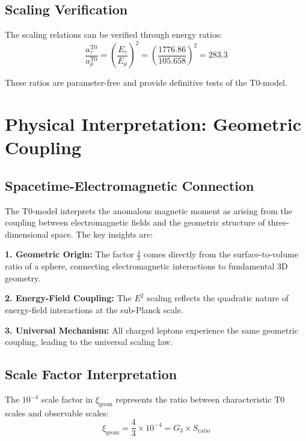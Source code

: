 \documentclass[12pt,a4paper]{report}
\newcommand{\xigeom}{\xi_{\text{geom}}}   %
\newcommand{\Emu}{E_\mu}                  %
\newcommand{\Etau}{E_\tau}                %
\begin{document}
\subsection{Scaling Verification}
\label{subsec:scaling_verification}

The scaling relations can be verified through energy ratios:
\begin{equation}
	\frac{a_\tau^{\text{T0}}}{a_\mu^{\text{T0}}} = \left(\frac{\Etau}{\Emu}\right)^2 = \left(\frac{1776.86}{105.658}\right)^2 = 283.3
	\label{eq:tau_muon_ratio}
\end{equation}

These ratios are parameter-free and provide definitive tests of the T0-model.

\section{Physical Interpretation: Geometric Coupling}
\label{sec:physical_interpretation}

\subsection{Spacetime-Electromagnetic Connection}
\label{subsec:spacetime_electromagnetic}

The T0-model interprets the anomalous magnetic moment as arising from the coupling between electromagnetic fields and the geometric structure of three-dimensional space. The key insights are:

\textbf{1. Geometric Origin:}
The factor $\frac{4}{3}$ comes directly from the surface-to-volume ratio of a sphere, connecting electromagnetic interactions to fundamental 3D geometry.

\textbf{2. Energy-Field Coupling:}
The $E^2$ scaling reflects the quadratic nature of energy-field interactions at the sub-Planck scale.

\textbf{3. Universal Mechanism:}
All charged leptons experience the same geometric coupling, leading to the universal scaling law.

\subsection{Scale Factor Interpretation}
\label{subsec:scale_factor}

The $10^{-4}$ scale factor in $\xigeom$ represents the ratio between characteristic T0 scales and observable scales:
\begin{equation}
	\xigeom = \frac{4}{3} \times 10^{-4} = G_3 \times S_{\text{ratio}}
	\label{eq:scale_interpretation}
\end{equation}
\end{document}
